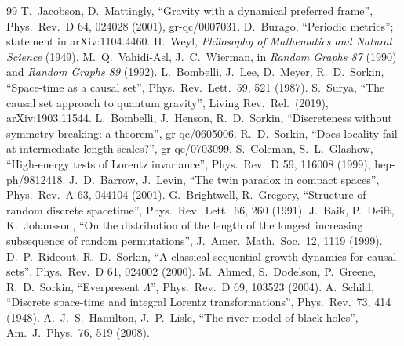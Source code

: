 \documentclass[11pt,a4paper]{article}
\begin{document}
\begin{thebibliography}{99}\small
{} T.~Jacobson, D.~Mattingly, ``Gravity with a dynamical preferred frame'', Phys.\ Rev.\ D 64, 024028 (2001), gr-qc/0007031.
 D.~Burago, ``Periodic metrics''; statement in arXiv:1104.4460.
 H.~Weyl, \emph{Philosophy of Mathematics and Natural Science} (1949).
 M.~Q.~Vahidi-Asl, J.~C.~Wierman, in \emph{Random Graphs 87} (1990) and \emph{Random Graphs 89} (1992).
 L.~Bombelli, J.~Lee, D.~Meyer, R.~D.~Sorkin, ``Space-time as a causal set'', Phys.\ Rev.\ Lett.\ 59, 521 (1987).
 S.~Surya, ``The causal set approach to quantum gravity'', Living Rev.\ Rel.\ (2019), arXiv:1903.11544.
 L.~Bombelli, J.~Henson, R.~D.~Sorkin, ``Discreteness without symmetry breaking: a theorem'', gr-qc/0605006.
 R.~D.~Sorkin, ``Does locality fail at intermediate length-scales?'', gr-qc/0703099.
 S.~Coleman, S.~L.~Glashow, ``High-energy tests of Lorentz invariance'', Phys.\ Rev.\ D 59, 116008 (1999), hep-ph/9812418.
 J.~D.~Barrow, J.~Levin, ``The twin paradox in compact spaces'', Phys.\ Rev.\ A 63, 044104 (2001).
 G.~Brightwell, R.~Gregory, ``Structure of random discrete spacetime'', Phys.\ Rev.\ Lett.\ 66, 260 (1991).
 J.~Baik, P.~Deift, K.~Johansson, ``On the distribution of the length of the longest increasing subsequence of random permutations'', J.\ Amer.\ Math.\ Soc.\ 12, 1119 (1999).
 D.~P.~Rideout, R.~D.~Sorkin, ``A classical sequential growth dynamics for causal sets'', Phys.\ Rev.\ D 61, 024002 (2000).
 M.~Ahmed, S.~Dodelson, P.~Greene, R.~D.~Sorkin, ``Everpresent $\Lambda$'', Phys.\ Rev.\ D 69, 103523 (2004).
 A.~Schild, ``Discrete space-time and integral Lorentz transformations'', Phys.\ Rev.\ 73, 414 (1948).
 A.~J.~S.~Hamilton, J.~P.~Lisle, ``The river model of black holes'', Am.\ J.\ Phys.\ 76, 519 (2008).
\end{thebibliography}
\end{document}
